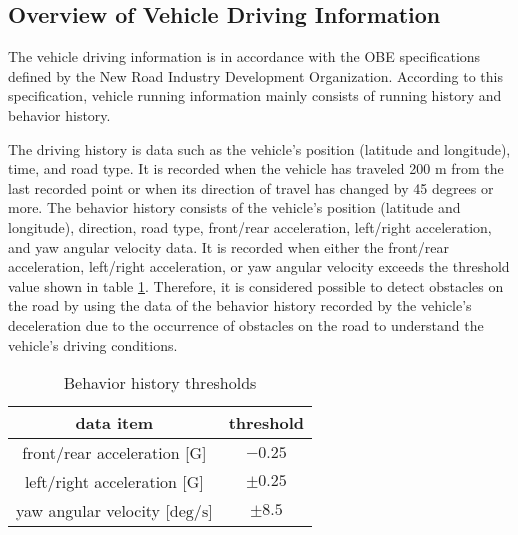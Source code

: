 \documentclass[paper]{ieice}
\begin{document}
\subsection{Overview of Vehicle Driving Information}
\label{sec:overview_of_vehicle_driving_information}
%
The vehicle driving information is in accordance with the OBE specifications defined by the New Road Industry Development Organization\cite{probdata_format}.
%
According to this specification, vehicle running information mainly consists of running history and behavior history.
%
\par
%
The driving history is data such as the vehicle's position (latitude and longitude), time, and road type.
%
It is recorded when the vehicle has traveled 200 m from the last recorded point or when its direction of travel has changed by 45 degrees or more.
%
The behavior history consists of the vehicle's position (latitude and longitude), direction, road type, front/rear acceleration, left/right acceleration, and yaw angular velocity data.
%
It is recorded when either the front/rear acceleration, left/right acceleration, or yaw angular velocity exceeds the threshold value shown in table \ref{tab:behavior_history_threshold}.
%
Therefore, it is considered possible to detect obstacles on the road by using the data of the behavior history recorded by the vehicle's deceleration due to the occurrence of obstacles on the road to understand the vehicle's driving conditions.
%
\begin{table}[tpb]
  \caption{Behavior history thresholds}
  \label{tab:behavior_history_threshold}
  \begin{center}
  \begin{tabular}{c|c}
    data item & threshold                   \\ \hline \hline
    front/rear acceleration [$\mathrm{G}$] & $-0.25$      \\ \hline
    left/right acceleration [$\mathrm{G}$] & $\pm0.25$    \\ \hline
    yaw angular velocity [$\mathrm{deg/s}$]& $\pm8.5$ \\ \hline
\end{tabular}
\end{center}
\end{table}
\end{document}

